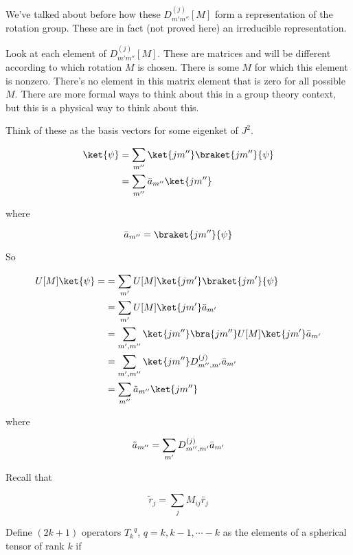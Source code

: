 We've talked about before how these $D^{(j)}_{m' m''}[M]$ form a representation of the rotation group.  These are in fact (not proved here) an irreducible representation.

Look at each element of $D^{(j)}_{m' m''}[M]$.  These are matrices and will be different according to which rotation $M$ is chosen.  There is some $M$ for which this element is nonzero.  There's no element in this matrix element that is zero for all possible $M$.  There are more formal ways to think about this in a group theory context, but this is a physical way to think about this.

Think of these as the basis vectors for some eigenket of $J^2$.

\begin{align*}
\ket{\psi} 
&= \sum_{m''} \ket{j m''} \braket{j m''}{\psi} \\
&= \sum_{m''} \bar{a}_{m''} \ket{j m''}
\end{align*}

where

\begin{equation}\label{eqn:qmTwoL19:250}
\bar{a}_{m''} = \braket{j m''}{\psi} 
\end{equation}

So

\begin{align*}
U[M] \ket{\psi} = 
&= \sum_{m'} U[M] \ket{j m'} \braket{j m'}{\psi} \\
&= \sum_{m'} U[M] \ket{j m'} \bar{a}_{m'} \\
&= \sum_{m', m''} 
\ket{j m''} \bra{j m''}
U[M] \ket{j m'} \bar{a}_{m'} \\
&= \sum_{m', m''} 
\ket{j m''} 
D^{(j)}_{m'', m'}
\bar{a}_{m'} \\
&= \sum_{m''} 
\tilde{a}_{m''} 
\ket{j m''} 
\end{align*}

where 

\begin{equation}\label{eqn:qmTwoL19:270}
\tilde{a}_{m''} = \sum_{m'} D^{(j)}_{m'', m'} \bar{a}_{m'} \\
\end{equation}

Recall that 

\begin{equation}\label{eqn:qmTwoL19:290}
\tilde{r}_j = \sum_j M_{ij} \bar{r}_j
\end{equation}

Define $(2k + 1)$ operators ${T_k}^q$, $q = k, k-1, \cdots -k$ as the elements of a spherical tensor of rank $k$ if 

